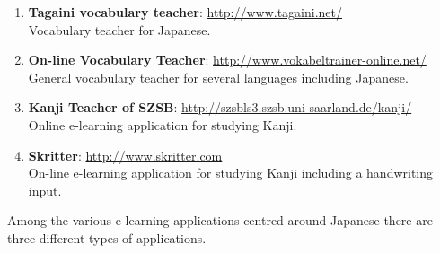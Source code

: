 \begin{enumerate}
          \url{http://www.kanjigym.de/} \\
          E-Learning application for studying Kanji with the Heisig 
          system.\footnote{The Heisig system is a method for studying Kanji,
            discussed in section~\ref{sec:japanesedifficulties}.}
    \item \textbf{Tagaini vocabulary teacher}:
          \url{http://www.tagaini.net/} \\
          Vocabulary teacher for Japanese.
    \item \textbf{On-line Vocabulary Teacher}:
          \url{http://www.vokabeltrainer-online.net/} \\
          General vocabulary teacher for several languages including Japanese.
    \item \textbf{Kanji Teacher of SZSB}:
          \url{http://szsbls3.szsb.uni-saarland.de/kanji/} \\
          Online e-learning application for studying Kanji.
    \item \textbf{Skritter}: \label{concept:skritter}
          \url{http://www.skritter.com} \\
          On-line e-learning application for studying Kanji including a
          handwriting input.
\end{enumerate}
Among the various e-learning applications centred around Japanese there are 
three different types of applications.

